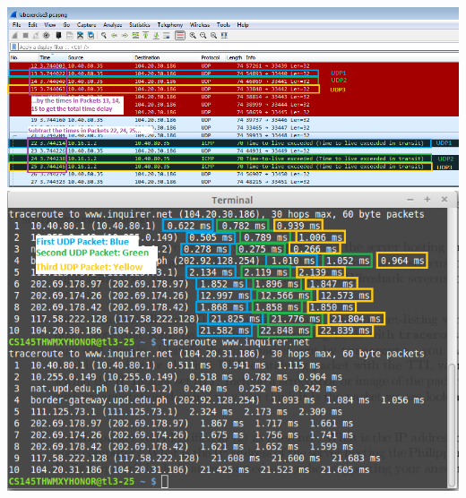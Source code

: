 \documentclass[11pt]{article}
\begin{document}
\begin{enumerate}
\begin{center}
\includegraphics[scale=0.5]{Q10A} \\
\includegraphics[scale=0.5]{Q10B}
\end{center}

\end{enumerate}
\end{document}
